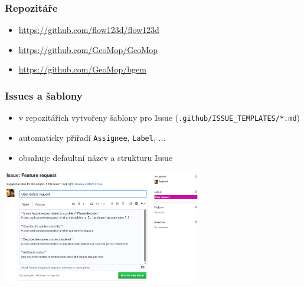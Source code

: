 \documentclass[10pt, xcolor=dvipsnames]{beamer} %
\begin{document}
\begin{frame}
  \frametitle{Repozitáře}

  \begin{itemize}
    \setlength\itemsep{15pt}
    \item \url{https://github.com/flow123d/flow123d}
    \item \url{https://github.com/GeoMop/GeoMop}
    \item \url{https://github.com/GeoMop/bgem}
  \end{itemize}

\end{frame}

\begin{frame}[fragile]
  \frametitle{Issues a šablony}

  \begin{itemize}
    \setlength\itemsep{15pt}
    \item v repozitářích vytvořeny šablony pro Issue (\verb'.github/ISSUE_TEMPLATES/*.md')
    \item automaticky přiřadí \verb'Assignee', \verb'Label', $\ldots$
    \item obsahuje defaultní název a strukturu Issue
  \end{itemize}

  \begin{center}
  \includegraphics[width=0.65\textwidth]{issue_template.png}
  \end{center}
\end{frame}
\end{document}

